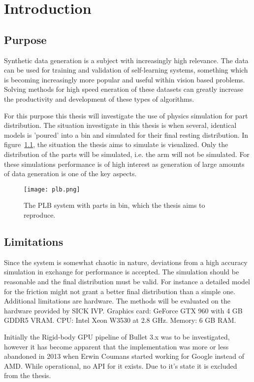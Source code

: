 \chapter{Introduction}\label{cha:intro}

\section{Purpose}

Synthetic data generation is a subject with increasingly high relevance.
The data can be used for training and validation of self-learning systems,
something which is becoming increasingly more popular and useful within vision
based problems. Solving methods for high speed eneration of these datasets
can greatly increase the productivity and development of these
types of algorithms.

For this purpose this thesis will investigate the use of physics
simulation for part distribution. The situation investigate in this thesis
is when several, identical models is  'poured' into a bin and simulated for their
final resting distribution. In figure~\ref{fig:plb}, the situation
the thesis aims to simulate is visualized. Only the distribution of the parts
will be simulated, i.e. the arm will not be simulated. For these simulations
performance is of high interest as generation of large amounts of data generation
is one of the key aspects.

\begin{figure}[ht]
  \centering
  \texttt{[image: plb.png]}
  \caption{The PLB system with parts in bin, which the thesis aims to reproduce.~\cite{fig:plb}}
  \label{fig:plb}
\end{figure}

\section{Limitations}
Since the system is somewhat chaotic in nature, deviations from a high accuracy
simulation in exchange for performance is accepted. The simulation should be reasonable
and the final distribution must be valid. For instance a detailed
model for the friction might not grant a better final distribution than a simple one.
Additional limitations are hardware. The methods will be evaluated on the hardware
provided by SICK IVP. Graphics card: GeForce GTX 960 with 4 GB GDDR5 VRAM.
CPU: Intel Xeon W3530 at 2.8 GHz.
Memory: 6 GB RAM.

Initially the Rigid-body GPU pipeline of Bullet 3.x was to be investigated, however
it has become apparent that the implementation was more or less abandoned in 2013
when Erwin Coumans started working for Google instead of AMD. While operational,
no API for it exists. Due to it's state it is excluded from the thesis.

